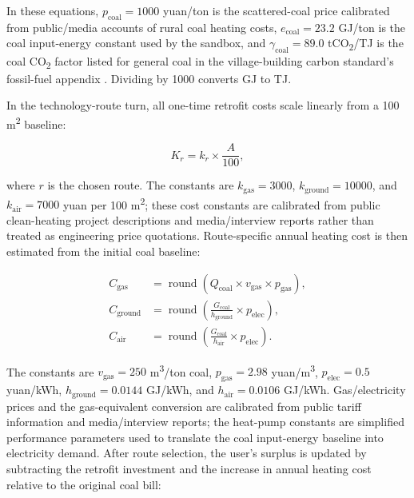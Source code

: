 \documentclass[stu,12pt,floatsintext,donotrepeattitle]{apa7}
\begin{document}
In these equations, \(p_{\mathrm{coal}}=1000\) yuan/ton is the scattered-coal price calibrated from public/media accounts of rural coal heating costs, \(e_{\mathrm{coal}}=23.2\) GJ/ton is the coal input-energy constant used by the sandbox, and \(\gamma_{\mathrm{coal}}=89.0\) tCO\textsubscript{2}/TJ is the coal CO\textsubscript{2} factor listed for general coal in the village-building carbon standard's fossil-fuel appendix \cite{cabr2025rural}. Dividing by 1000 converts GJ to TJ.

In the technology-route turn, all one-time retrofit costs scale linearly from a 100 m\textsuperscript{2} baseline:

\begin{equation}
K_r = k_r \times \frac{A}{100},
\end{equation}

where \(r\) is the chosen route. The constants are \(k_{\mathrm{gas}}=3000\), \(k_{\mathrm{ground}}=10000\), and \(k_{\mathrm{air}}=7000\) yuan per 100 m\textsuperscript{2}; these cost constants are calibrated from public clean-heating project descriptions and media/interview reports rather than treated as engineering price quotations. Route-specific annual heating cost is then estimated from the initial coal baseline:

\begin{align}
C_{\mathrm{gas}} &= \operatorname{round}(Q_{\mathrm{coal}} \times v_{\mathrm{gas}} \times p_{\mathrm{gas}}), \\
C_{\mathrm{ground}} &= \operatorname{round}\left(\frac{G_{\mathrm{coal}}}{h_{\mathrm{ground}}} \times p_{\mathrm{elec}}\right), \\
C_{\mathrm{air}} &= \operatorname{round}\left(\frac{G_{\mathrm{coal}}}{h_{\mathrm{air}}} \times p_{\mathrm{elec}}\right).
\end{align}

The constants are \(v_{\mathrm{gas}}=250\) m\textsuperscript{3}/ton coal, \(p_{\mathrm{gas}}=2.98\) yuan/m\textsuperscript{3}, \(p_{\mathrm{elec}}=0.5\) yuan/kWh, \(h_{\mathrm{ground}}=0.0144\) GJ/kWh, and \(h_{\mathrm{air}}=0.0106\) GJ/kWh. Gas/electricity prices and the gas-equivalent conversion are calibrated from public tariff information and media/interview reports; the heat-pump constants are simplified performance parameters used to translate the coal input-energy baseline into electricity demand. After route selection, the user's surplus is updated by subtracting the retrofit investment and the increase in annual heating cost relative to the original coal bill:
\end{document}
